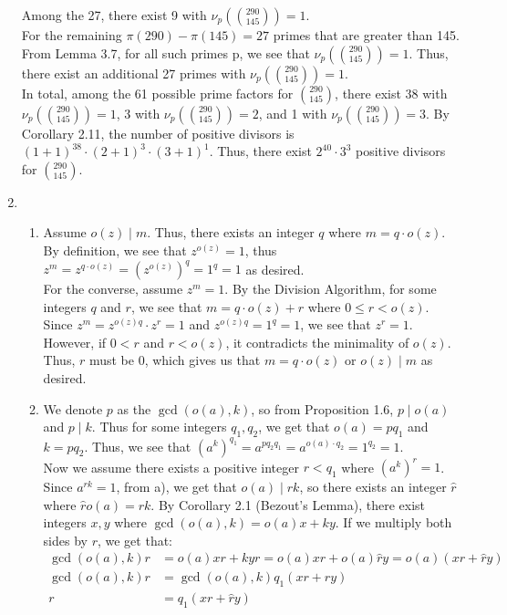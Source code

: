 \documentclass{article}
\begin{document}
\begin{enumerate}[leftmargin=*, label=\arabic*.]
    Among the 27, there exist 9 with $\nu_p (\binom{290}{145}) = 1$.\\

     For the remaining $\pi(290) - \pi(145) = 27$ primes that are greater than 145. From Lemma 3.7, for all such primes p, we see that $\nu_p (\binom{290}{145}) = 1$. Thus, there exist an additional 27 primes with $\nu_p (\binom{290}{145}) = 1$. \\

     In total, among the 61 possible prime factors for $\binom{290}{145}$, there exist 38 with $\nu_p (\binom{290}{145}) = 1$, 3 with $\nu_p (\binom{290}{145}) = 2$, and 1 with $\nu_p (\binom{290}{145}) = 3$. By Corollary 2.11, the number of positive divisors is $(1+1)^{38} \cdot (2+1)^3 \cdot (3+1)^1$. Thus, there exist $2^{40} \cdot 3^3$ positive divisors for $\binom{290}{145}$. \\

    \newpage
    
     \item 
     \begin{enumerate}[label=\alph*)]
     \item 
     Assume $o(z) \mid m$. Thus, there exists an integer $q$ where $m = q \cdot o(z)$. By definition, we see that $z^{o(z)} = 1$, thus $z^m = z^{q \cdot o(z)} = (z^{o(z)})^q = 1^q = 1$ as desired. \\

    For the converse, assume $z^m = 1$. By the Division Algorithm, for some integers $q$ and $r$, we see that $m = q \cdot o(z) + r$ where $0 \leq r < o(z)$. Since $z^m = z^{o(z)q} \cdot z^r = 1$ and $z^{o(z)q} = 1^q = 1$, we see that $z^r = 1$. However, if $0 < r$ and $r < o(z)$, it contradicts the minimality of $o(z)$. Thus, $r$ must be 0, which gives us that $m = q \cdot o(z)$ or $o(z) \mid m$ as desired. \\


     \item 
      We denote $p$ as the $\gcd(o(a), k)$, so from Proposition 1.6, $p \mid o(a)$ and $p \mid k$. Thus for some integers $q_1, q_2$, we get that $o(a) = p q_1$ and $k = p q_2$. Thus, we see that $(a^k)^{q_1} = a^{p q_2 q_1} = a^{o(a)\cdot q_2} = 1^{q_2} = 1$. \\

    Now we assume there exists a positive integer $r < q_1$ where $(a^k)^r = 1$. Since $a^{r k} = 1$, from a), we get that $o(a) \mid r k$, so there exists an integer $\hat{r}$ where $\hat{r} o(a) = r k$. By Corollary 2.1 (Bezout's Lemma), there exist integers $x, y$ where $\gcd(o(a), k) = o(a)x + k y$. If we multiply both sides by $r$, we get that: 
    \begin{align*}
        \gcd(o(a), k) r &= o(a) x r + k y r = o(a) x r + o(a) \hat{r} y = o(a)(x r + \hat{r} y)\\
        \gcd(o(a), k) r &= \gcd(o(a), k) q_1 (x r + \hat{r} y)\\
        r &= q_1 (x r + \hat{r} y)
    \end{align*}
    

\end{enumerate}
\end{enumerate}
\end{document}
